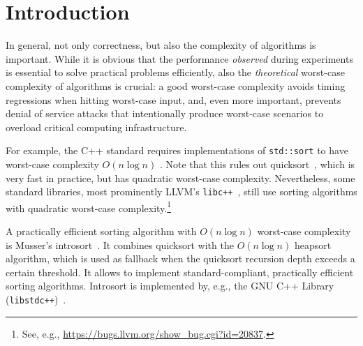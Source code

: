 \documentclass[acmsmall]{acmart}
\newcommand{\is}{\lstinline[language=isabelle]}
\begin{document}


\maketitle



\section{Introduction}
In general, not only correctness, but also the complexity of algorithms is important. While it is obvious that the performance \emph{observed} during experiments is essential to solve practical problems efficiently, also the \emph{theoretical} worst-case complexity of algorithms is crucial: a good worst-case complexity avoids timing regressions when hitting worst-case input, and, even more important, prevents denial of service attacks that intentionally produce worst-case scenarios to overload critical computing infrastructure.

For example, the C++ standard requires  implementations of \is{std::sort} to have worst-case complexity $O(n\log n)$ \cite{stdlib-sort}. 
Note that this rules out quicksort~\cite{Hoare61}, which is very fast in practice, but has quadratic worst-case complexity.
Nevertheless, some standard libraries, most prominently LLVM's \is{libc++}~\cite{libc++}, still use sorting algorithms with quadratic worst-case complexity.\footnote{See, e.g., \url{https://bugs.llvm.org/show_bug.cgi?id=20837}.}

A practically efficient sorting algorithm with $O(n\log n)$ worst-case complexity is Musser's introsort~\cite{Musser97}. It combines quicksort with the
$O(n\log n)$ heapsort algorithm, which is used as fallback when the quicksort recursion depth exceeds a certain threshold. It allows to implement standard-compliant, practically efficient sorting algorithms. Introsort is implemented by, e.g., the GNU C++ Library (\is{libstdc++})~\cite{libstdc++}.
\end{document}
